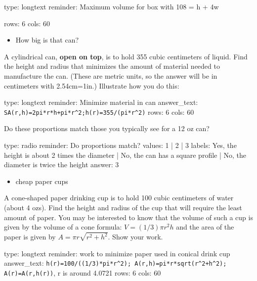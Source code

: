 \documentclass[12pt]{article}
\begin{document}
\begin{answer}
type: longtext
reminder: Maximum volume for box with 108 = h + 4w

rows: 6
cols: 60
\end{answer}

\begin{itemize}
\itemsep1pt\parskip0pt
\item
  How big is that can?
\end{itemize}

A cylindrical can, \textbf{open on top}, is to hold 355 cubic
centimeters of liquid. Find the height and radius that minimizes the
amount of material needed to manufacture the can. (These are metric
units, so the answer will be in centimeters with 2.54cm=1in.) Illustrate
how you do this:

\begin{answer}
type: longtext
reminder: Minimize material in can
answer_text: \verb#SA(r,h)=2pi*r*h+pi*r^2;h(r)=355/(pi*r^2)# 
rows: 6
cols: 60
\end{answer}

Do these proportions match those you typically see for a 12 oz can?

\begin{answer}
type: radio
reminder: Do proportions match?
values: 1 | 2 | 3
labels: Yes, the height is about 2 times the diameter | No, the can has a square profile | No, the diameter is twice the height
answer: 3
\end{answer}

\begin{itemize}
\itemsep1pt\parskip0pt
\item
  cheap paper cups
\end{itemize}

A cone-shaped paper drinking cup is to hold 100 cubic centimeters of
water (about 4 ozs). Find the height and radius of the cup that will
require the least amount of paper. You may be interested to know that
the volume of such a cup is given by the volume of a cone formula:
$V = (1/3)\pi r^2 h$ and the area of the paper is given by
$A=\pi r \sqrt{r^2 + h^2}$. Show your work.

\begin{answer}
type: longtext
reminder: work to minimize paper used in conical drink cup
answer_text: \verb#h(r)=100/((1/3)*pi*r^2); A(r,h)=pi*r*sqrt(r^2+h^2); A(r)=A(r,h(r))#, r is around 4.0721 
rows: 6
cols: 60
\end{answer}
\end{document}
